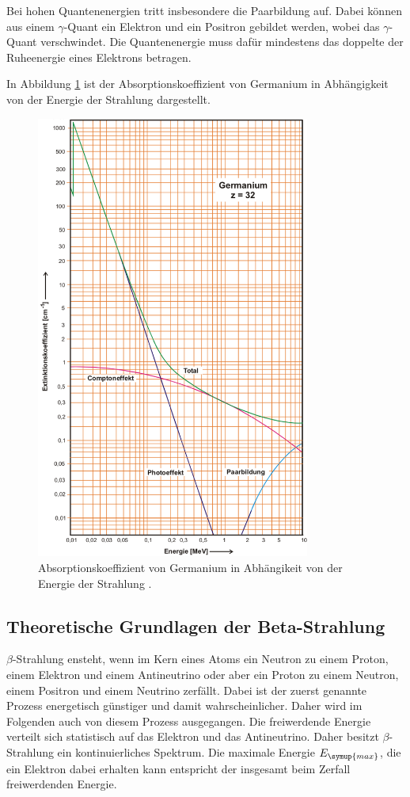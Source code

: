 Bei hohen Quantenenergien tritt insbesondere die Paarbildung auf. Dabei können aus
einem $\gamma$-Quant ein Elektron und ein Positron gebildet werden, wobei das
$\gamma$-Quant verschwindet. Die Quantenenergie muss dafür mindestens das doppelte
der Ruheenergie eines Elektrons betragen.

In Abbildung \ref{fig:gamma} ist der Absorptionskoeffizient von Germanium in
Abhängigkeit von der Energie der Strahlung dargestellt.


\begin{figure}
  \centering
  \includegraphics[width=9cm]{data/germanium.png}
  \caption{Absorptionskoeffizient von Germanium in Abhängikeit von der Energie
  der Strahlung \cite{Versuchsanleitung}.}
  \label{fig:gamma}
\end{figure}


\subsection{Theoretische Grundlagen der Beta-Strahlung} %
\label{subsec:beta}

$\beta$-Strahlung ensteht, wenn im Kern eines Atoms ein Neutron zu einem Proton, einem
Elektron und einem Antineutrino oder aber ein Proton zu einem Neutron, einem Positron
und einem Neutrino zerfällt. Dabei ist der zuerst genannte Prozess energetisch günstiger
und damit wahrscheinlicher. Daher wird im Folgenden auch von diesem Prozess ausgegangen.
Die freiwerdende Energie verteilt sich statistisch auf das Elektron und das Antineutrino.
Daher besitzt $\beta$-Strahlung
ein kontinuierliches Spektrum. Die maximale Energie $E_{\symup{max}}$, die ein
Elektron dabei erhalten kann entspricht der insgesamt beim Zerfall freiwerdenden Energie.

